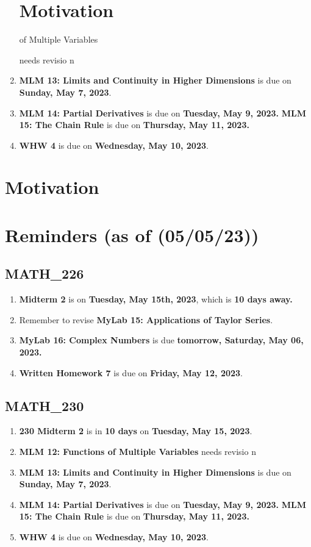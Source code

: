 \begin{enumerate}
{\section{Motivation}of Multiple Variables} needs revisio n
  \item \textbf{MLM 13: Limits and Continuity in Higher
        Dimensions} is due on \textbf{Sunday, May 7, 2023}.
  \item \textbf{MLM 14: Partial Derivatives} is due on
        \textbf{Tuesday, May 9, 2023.}
        \textbf \textbf{MLM 15: The Chain Rule} is due on
        \textbf{Thursday, May 11, 2023.}
  \item \textbf{WHW 4} is due on \textbf{Wednesday,
        May 10, 2023}.

\end{enumerate}

\section{Motivation}
\section{Reminders (as of (05/05/23))}
\subsection{MATH\_226}
\begin{enumerate}
  \item  \textbf{Midterm 2} is on \textbf{Tuesday, May 15th, 2023}, which is \textbf{10 days away.}
  \item Remember to revise \textbf{MyLab 15:
        Applications of Taylor Series}.
  \item \textbf{MyLab 16: Complex Numbers} is
        due \textbf{tomorrow, Saturday, May 06, 2023.}
  \item \textbf{Written Homework 7} is due on
        \textbf{Friday, May 12, 2023}.
\end{enumerate}
\subsection{MATH\_230}
\begin{enumerate}
  \item \textbf{230 Midterm 2} is in \textbf{10 days} on
        \textbf{Tuesday, May 15, 2023}.
  \item \textbf{MLM 12: Functions of Multiple Variables} needs revisio n
  \item \textbf{MLM 13: Limits and Continuity in Higher
        Dimensions} is due on \textbf{Sunday, May 7, 2023}.
  \item \textbf{MLM 14: Partial Derivatives} is due on
        \textbf{Tuesday, May 9, 2023.}
        \textbf \textbf{MLM 15: The Chain Rule} is due on
        \textbf{Thursday, May 11, 2023.}
  \item \textbf{WHW 4} is due on \textbf{Wednesday,
        May 10, 2023}.

\end{enumerate}

